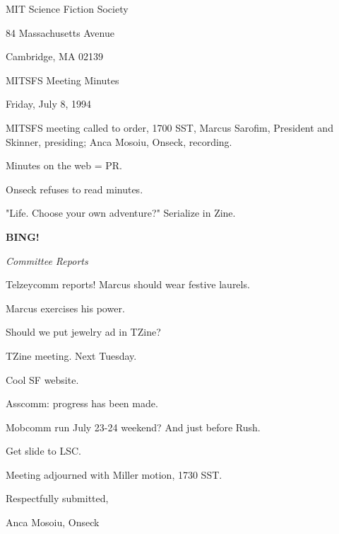\documentclass[12pt]{article}
\newcommand{\bing}{{\bf BING!} }
\newcommand{\goto}[1]{\bing \vskip 12pt \centerline{{\em{#1}}}}
\begin{document}
\begin{center}

MIT Science Fiction Society 

84 Massachusetts Avenue

Cambridge, MA 02139

\vspace{12pt}

MITSFS Meeting Minutes 

Friday, July 8, 1994

\end{center}
 
\vspace{18pt}

\setlength{\parskip}{6pt}

\noindent
MITSFS meeting called to order, 1700 SST,
Marcus Sarofim, President and Skinner, presiding; Anca Mosoiu, Onseck, recording.

Minutes on the web = PR.

Onseck refuses to read minutes.

"Life. Choose your own adventure?" Serialize in Zine.

\goto{Committee Reports}

Telzeycomm reports! Marcus should wear festive laurels.

Marcus exercises his power.

Should we put jewelry ad in TZine?

TZine meeting. Next Tuesday.

Cool SF website.

Asscomm: progress has been made.

Mobcomm run July 23-24 weekend? And just before Rush.

Get slide to LSC.

\vspace{12pt}

\noindent
Meeting adjourned with Miller motion, 1730 SST.

\vspace{18pt}

\centerline{Respectfully submitted,}
\centerline{Anca Mosoiu, Onseck}
\end{document}

